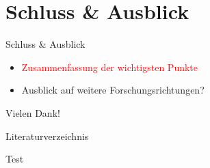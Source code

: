 \documentclass[aspectratio=169]{beamer} %
\begin{document}
    \section{Schluss \& Ausblick}
    \begin{frame}{Schluss \& Ausblick}
      \begin{itemize}
        \item \textcolor{red}{Zusammenfassung der wichtigsten Punkte}
        \item Ausblick auf weitere Forschungsrichtungen?
      \end{itemize}
    \end{frame}

    \begin{frame}
      \begin{center}
          \Huge Vielen Dank!
      \end{center}
  \end{frame}

    \begin{frame}{Literaturverzeichnis}
   \printbibliography%
    \end{frame}

    \begin{frame}
        Test~\cite{Aaij.2015,Aaij.2019,C.Amsler.2017,GellMann.1964,Zweig.1964,Zweig.1964b}
    \end{frame}
\end{document}
